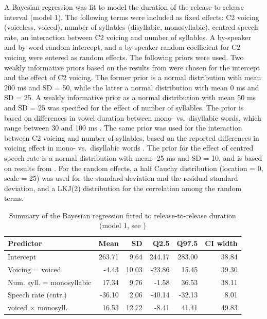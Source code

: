 \documentclass[
  12pt,
  a4paper,
  authoryear, 5p]{elsarticle}
\begin{document}
A Bayesian regression was fit to model the duration of the
release-to-release interval (model 1). The following terms were included
as fixed effects: C2 voicing (voiceless, voiced), number of syllables
(disyllabic, monosyllabic), centred speech rate, an interaction between
C2 voicing and number of syllables. A by-speaker and by-word random
intercept, and a by-speaker random coefficient for C2 voicing were
entered as random effects. The following priors were used. Two weakly
informative priors based on the results from \citet{coretta2018j} were
chosen for the intercept and the effect of C2 voicing. The former prior
is a normal distribution with mean 200 ms and SD = 50, while the latter
a normal distribution with mean 0 ms and SD = 25. A weakly informative
prior as a normal distribution with mean 50 ms and SD = 25 was specified
for the effect of number of syllables. The prior is based on differences
in vowel duration between mono- vs.~disyllabic words, which range
between 30 and 100 ms \citep{sharf1962, klatt1973}. The same prior was
used for the interaction between C2 voicing and number of syllables,
based on the reported differences in voicing effect in mono-
vs.~disyllabic words \citep{sharf1962, klatt1973}. The prior for the
effect of centred speech rate is a normal distribution with mean -25 ms
and SD = 10, and is based on results from \citet{coretta2018j}. For the
random effects, a half Cauchy distribution (location = 0, scale = 25)
was used for the standard deviation and the residual standard deviation,
and a LKJ(2) distribution for the correlation among the random terms.

\begin{table}[t]

\caption{\label{tab:rr-1-table}Summary of the Bayesian regression fitted to release-to-release duration (model 1, see )}
\centering
\fontsize{8}{10}\selectfont
\begin{tabular}{lrrrrr}
\toprule
Predictor & Mean & SD & Q2.5 & Q97.5 & CI width\\
\midrule
Intercept & 263.71 & 9.64 & 244.17 & 283.00 & 38.84\\
Voicing = voiced & -4.43 & 10.03 & -23.86 & 15.45 & 39.30\\
Num. syll. = monosyllabic & 17.34 & 9.76 & -1.58 & 36.53 & 38.11\\
Speech rate (cntr.) & -36.10 & 2.06 & -40.14 & -32.13 & 8.01\\
voiced × monosyll. & 16.53 & 12.72 & -8.41 & 41.41 & 49.83\\
\bottomrule
\end{tabular}
\end{table}
\end{document}
